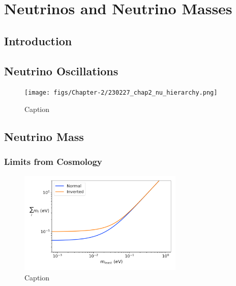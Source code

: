 
\chapter{Neutrinos and Neutrino Masses}

\section{Introduction}


\section{Neutrino Oscillations}


\begin{figure}[htbp]
    \centering
    \texttt{[image: figs/Chapter-2/230227\_chap2\_nu\_hierarchy.png]}
    \caption{Caption}
    \label{fig:nu_hierarchy}
\end{figure}



\section{Neutrino Mass}

\subsection{Limits from Cosmology}



\begin{figure}[htbp]
    \centering
    \includegraphics[width=0.7\textwidth]{figs/Chapter-2/230301_cosmology_nu_mass_observable.png}
    \caption{Caption}
    \label{fig:nu_mass_cosmo}
\end{figure}


